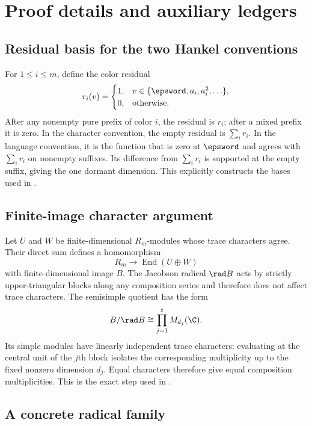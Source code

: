 \section{Proof details and auxiliary ledgers}
\label{app:proofs}

\subsection{Residual basis for the two Hankel conventions}

For \(1\le i\le m\), define the color residual
\[
 r_i(v)=
 \begin{cases}
 1,&v\in\{\epsword,a_i,a_i^2,\ldots\},\\
 0,&\text{otherwise}.
 \end{cases}
\]
After any nonempty pure prefix of color \(i\), the residual is \(r_i\); after
a mixed prefix it is zero.  In the character convention, the empty residual
is \(\sum_i r_i\).  In the language convention, it is the function that is
zero at \(\epsword\) and agrees with \(\sum_i r_i\) on nonempty suffixes.  Its
difference from \(\sum_i r_i\) is supported at the empty suffix, giving the
one dormant dimension.  This explicitly constructs the bases used in
.

\subsection{Finite-image character argument}

Let \(U\) and \(W\) be finite-dimensional \(R_m\)-modules whose trace
characters agree.  Their direct sum defines a homomorphism
\[
 R_m\longrightarrow\operatorname{End}(U\oplus W)
\]
with finite-dimensional image \(B\).  The Jacobson radical \(\rad B\) acts by
strictly upper-triangular blocks along any composition series and therefore
does not affect trace characters.  The semisimple quotient has the form
\[
 B/\rad B\cong\prod_{j=1}^tM_{d_j}(\C).
\]
Its simple modules have linearly independent trace characters: evaluating at
the central unit of the \(j\)th block isolates the corresponding multiplicity
up to the fixed nonzero dimension \(d_j\).  Equal characters therefore give
equal composition multiplicities.  This is the exact step used in
.

\subsection{A concrete radical family}

